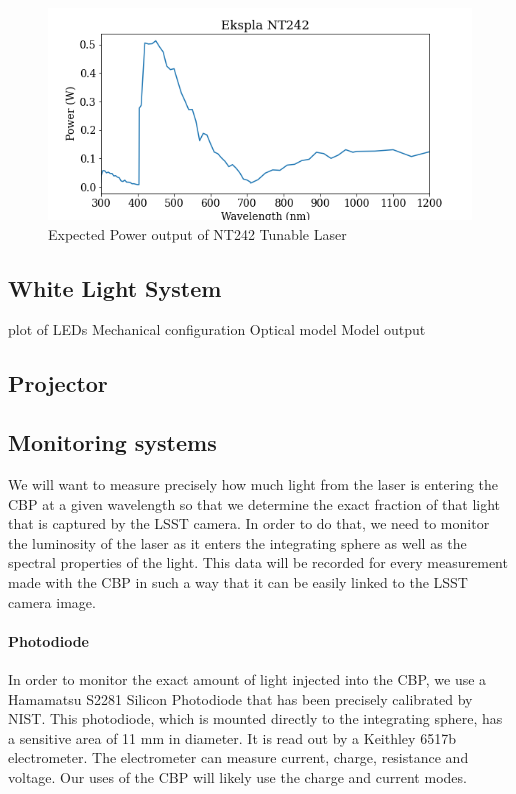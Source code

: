 \documentclass[SE,authoryear,lsstdraft,toc]{lsstdoc}
\begin{document}
\begin{figure}[h]
    \centering
    \includegraphics[width=\textwidth]{nt242_output.png}
    \caption{Expected Power output of NT242 Tunable Laser}
    \label{fig:laser_power}
\end{figure}


\subsection{White Light System}
plot of LEDs
Mechanical configuration
Optical model
Model output

\subsection{Projector}

\subsection{Monitoring systems}

We will want to measure precisely how much light from the laser is entering the CBP at a given wavelength so that we determine the exact fraction of that light that is captured by the LSST camera. In order to do that, we need to monitor the luminosity of the laser as it enters the integrating sphere as well as the spectral properties of the light. This data will be recorded for every measurement made with the CBP in such a way that it can be easily linked to the LSST camera image. 

\paragraph{\textbf{Photodiode}}

In order to monitor the exact amount of light injected into the CBP, we use a Hamamatsu S2281 Silicon Photodiode that has been precisely calibrated by NIST. 
This photodiode, which is mounted directly to the integrating sphere, has a sensitive area of 11 mm in diameter. It is read out by a Keithley 6517b electrometer. The electrometer can measure current, charge, resistance and voltage. Our uses of the CBP will likely use the charge and current modes. 
\end{document}
